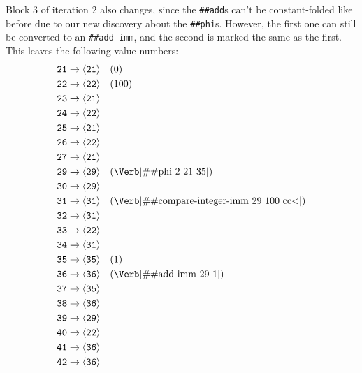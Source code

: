 Block $3$ of iteration $2$ also changes, since the \Verb|##add|s can't be
constant-folded like before due to our new discovery about the \Verb|##phi|s.
However, the first one can still be converted to an \Verb|##add-imm|, and the
second is marked the same as the first.  This leaves the following value
numbers:
%
\begin{align*}
  \texttt{21} &\to \vn{21} \quad (0)                                                \\
  \texttt{22} &\to \vn{22} \quad (100)                                              \\
  \texttt{23} &\to \vn{21}                                                          \\
  \texttt{24} &\to \vn{22}                                                          \\
  \texttt{25} &\to \vn{21}                                                          \\
  \texttt{26} &\to \vn{22}                                                          \\
  \texttt{27} &\to \vn{21}                                                          \\
  \texttt{29} &\to \vn{29} \quad (\text{\Verb|\#\#phi 2 21 35|})                    \\
  \texttt{30} &\to \vn{29}                                                          \\
  \texttt{31} &\to \vn{31} \quad (\text{\Verb|\#\#compare-integer-imm 29 100 cc<|}) \\
  \texttt{32} &\to \vn{31}                                                          \\
  \texttt{33} &\to \vn{22}                                                          \\
  \texttt{34} &\to \vn{31}                                                          \\
  \texttt{35} &\to \vn{35} \quad (1)                                                \\
  \texttt{36} &\to \vn{36} \quad (\text{\Verb|\#\#add-imm 29 1|})                   \\
  \texttt{37} &\to \vn{35}                                                          \\
  \texttt{38} &\to \vn{36}                                                          \\
  \texttt{39} &\to \vn{29}                                                          \\
  \texttt{40} &\to \vn{22}                                                          \\
  \texttt{41} &\to \vn{36}                                                          \\
  \texttt{42} &\to \vn{36}
\end{align*}

